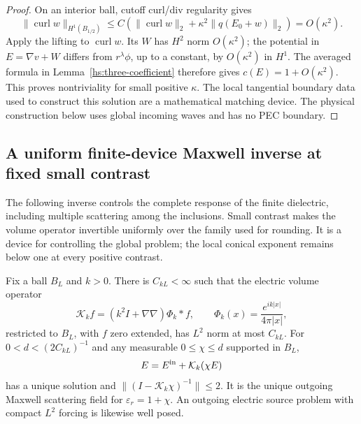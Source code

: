 \begin{proof}
On an interior ball, cutoff curl/div regularity gives
\begin{equation}
 \|\operatorname{curl}w\|_{H^1(B_{1/2})}
 \leq C\left(\|\operatorname{curl}w\|_2
              +\kappa^2\|q(E_0+w)\|_2\right)=O(\kappa^2).
 \label{hs:three-local-curl-small}
\end{equation}
Apply the lifting to $\operatorname{curl}w$.  Its $W$ has $H^2$
norm $O(\kappa^2)$; the potential in $E=\nabla v+W$ differs from
$r^\lambda\phi$, up to a constant, by $O(\kappa^2)$ in $H^1$.
The averaged formula in Lemma~\ref{hs:three-coefficient} therefore
gives $c(E)=1+O(\kappa^2)$.  This proves nontriviality for small
positive $\kappa$.  The local tangential boundary data used to
construct this solution are a mathematical matching device.  The
physical construction below uses global incoming waves and has no
PEC boundary.
\end{proof}

\subsection{A uniform finite-device Maxwell inverse at fixed small contrast}
\label{hs:three-volume-subsection}

The following inverse controls the complete response of the finite
dielectric, including multiple scattering among the inclusions.  Small
contrast makes the volume operator invertible uniformly over the family
used for rounding.  It is a device for controlling the global problem;
the local conical exponent remains below one at every positive contrast.

\begin{lemma}
\label{hs:three-volume}
Fix a ball $B_L$ and $k>0$.  There is $C_{kL}<\infty$ such that
the electric volume operator
\begin{equation}
 \mathcal K_k f=(k^2I+\nabla\nabla)\Phi_k*f,
 \qquad \Phi_k(x)=\frac{e^{ik|x|}}{4\pi|x|},
 \label{hs:three-volume-operator}
\end{equation}
restricted to $B_L$, with $f$ zero extended, has $L^2$ norm at most
$C_{kL}$.  For $0<d<(2C_{kL})^{-1}$ and any measurable
$0\leq\chi\leq d$ supported in $B_L$,
\begin{equation}
 E=E^{\rm in}+\mathcal K_k(\chi E)
 \label{hs:three-volume-equation}
\end{equation}
has a unique solution and
$\|(I-\mathcal K_k\chi)^{-1}\|\leq2$.
It is the unique outgoing Maxwell scattering field for
$\varepsilon_r=1+\chi$.  An outgoing electric source problem with
compact $L^2$ forcing is likewise well posed.
\end{lemma}

